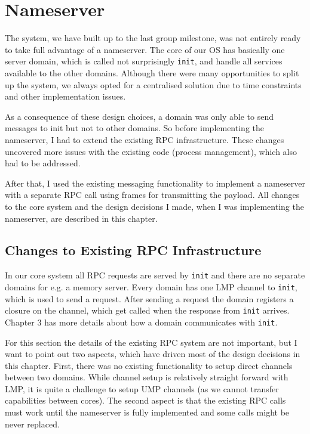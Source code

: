 \chapter{Nameserver}

The system, we have built up to the last group milestone, was not 
entirely ready to take full advantage of a nameserver. The core of our OS
has basically one server domain, which is called not surprisingly \verb|init|, 
and handle all services available to the other domains. Although there were
many opportunities to split up the system, we always opted for a centralised 
solution due to time constraints and other implementation issues.

As a consequence of these design choices, a domain was only able to send messages 
to init but not to other domains. So before implementing the nameserver, I had to
extend the existing RPC infrastructure. These changes uncovered more issues with
the existing code (process management), which also had to be addressed.

After that, I used the existing messaging functionality to implement a nameserver
with a separate RPC call using frames for transmitting the payload. All changes
to the core system and the design decisions I made, when I was implementing the
nameserver, are described in this chapter.

\section{Changes to Existing RPC Infrastructure}

In our core system all RPC requests are served by \verb|init| and there are no separate
domains for e.g. a memory server. Every domain has one LMP channel to \verb|init|, which
is used to send a request. After sending a request the domain registers a closure on the
channel, which get called when the response from \verb|init| arrives. Chapter 3 has more
details about how a domain communicates with \verb|init|.

For this section the details of the existing RPC system are not important, but I want to
point out two aspects, which have driven most of the design decisions in this chapter. 
First, there was no existing functionality to setup direct channels between two domains.
While channel setup is relatively straight forward with LMP, it is quite a challenge to
setup UMP channels (as we cannot transfer capabilities between cores).
The second aspect is that the existing RPC calls must work until the nameserver is fully
implemented and some calls might be never replaced.

